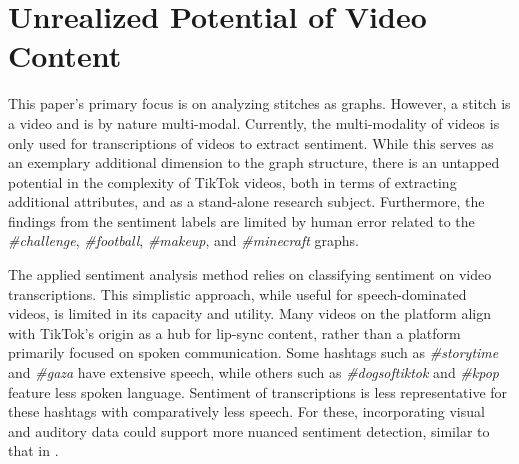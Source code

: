 % 



\section{Unrealized Potential of Video Content}
This paper's primary focus is on analyzing stitches as graphs. However, a stitch is a video and is by nature multi-modal. Currently, the multi-modality of videos is only used for transcriptions of videos to extract sentiment. While this serves as an exemplary additional dimension to the graph structure, there is an untapped potential in the complexity of TikTok videos, both in terms of extracting additional attributes, and as a stand-alone research subject. Furthermore, the findings from the sentiment labels are limited by human error related to the \textit{\#challenge}, \textit{\#football}, \textit{\#makeup}, and \textit{\#minecraft} graphs. 

The applied sentiment analysis method relies on classifying sentiment on video transcriptions. This simplistic approach, while useful for speech-dominated videos, is limited in its capacity and utility. Many videos on the platform align with TikTok's origin as a hub for lip-sync content, rather than a platform primarily focused on spoken communication. Some hashtags such as \textit{\#storytime} and \textit{\#gaza} have extensive speech, while others such as \textit{\#dogsoftiktok} and \textit{\#kpop} feature less spoken language. Sentiment of transcriptions is less representative for these hashtags with comparatively less speech. For these, incorporating visual and auditory data could support more nuanced sentiment detection, similar to that in \cite{lai2023multimodalsentimentanalysissurvey}.

